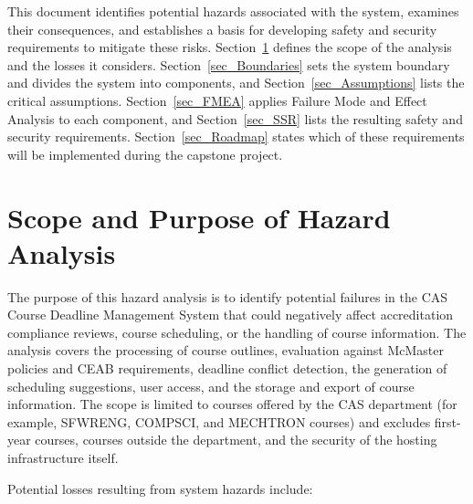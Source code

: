 \documentclass{article}
\begin{document}
This document identifies potential hazards associated with the system, examines their consequences, 
and establishes a basis for developing safety and security requirements to mitigate these risks. 
Section~\ref{sec_Scope} defines the scope of the analysis and the losses it considers. 
Section~\ref{sec_Boundaries} sets the system boundary and divides the system into components, and 
Section~\ref{sec_Assumptions} lists the critical assumptions. Section~\ref{sec_FMEA} applies Failure Mode and 
Effect Analysis to each component, and Section~\ref{sec_SSR} lists the resulting safety and security 
requirements. Section~\ref{sec_Roadmap} states which of these requirements will be implemented during the 
capstone project.


\section{Scope and Purpose of Hazard Analysis} \label{sec_Scope}


The purpose of this hazard analysis is to identify potential failures in the CAS Course Deadline 
Management System that could negatively affect accreditation compliance reviews, course scheduling, 
or the handling of course information. The analysis covers the processing of course outlines, 
evaluation against McMaster policies and CEAB requirements, deadline conflict detection, the 
generation of scheduling suggestions, user access, and the storage and export of course information. 
The scope is limited to courses offered by the CAS department (for example, SFWRENG, COMPSCI, and 
MECHTRON courses) and excludes first-year courses, courses outside the department, and the security 
of the hosting infrastructure itself.

\noindent Potential losses resulting from system hazards include:
\end{document}
